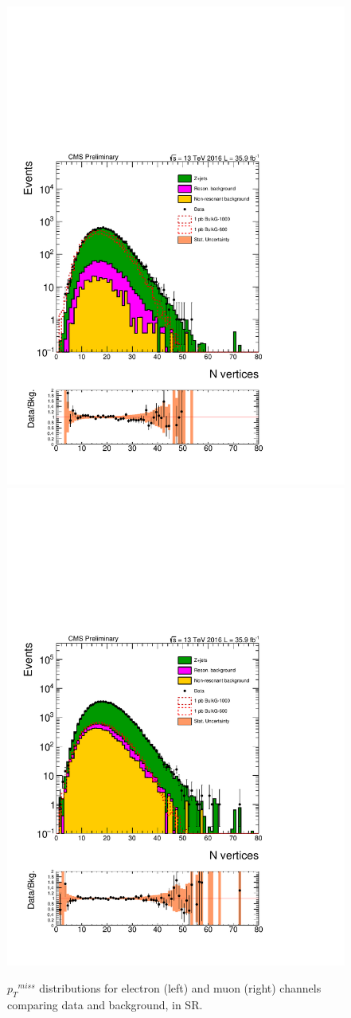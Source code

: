 \begin{figure}[htbp!]
\centering
\includegraphics[width=0.46\linewidth,page=16]{figures/ReMiniSummer16_DT_PhReMiniMCRcFixXsec_GMCPhPtWt_SRdPhiGT0p5_puWeightsummer16_muoneg_gjet_metfilter_unblind_el_log_1pb.pdf}
\includegraphics[width=0.46\linewidth,page=16]{figures/ReMiniSummer16_DT_PhReMiniMCRcFixXsec_GMCPhPtWt_SRdPhiGT0p5_puWeightsummer16_muoneg_gjet_metfilter_unblind_mu_log_1pb.pdf}
\caption{${p_{T}}^{miss}$ distributions for electron (left) and muon (right) channels
comparing data and background, in SR.}
\label{fit:SR_gjet_met_wide}
\end{figure}

